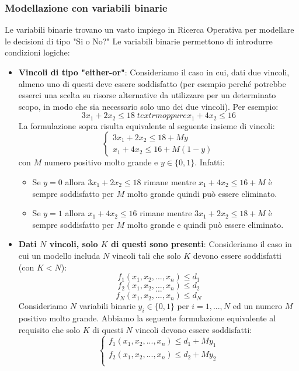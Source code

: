 \documentclass[12pt]{article}
\begin{document}
\subsubsection{Modellazione con variabili binarie}
Le variabili binarie trovano un vasto impiego in Ricerca Operativa per modellare le decisioni di tipo "Si o No?"
Le variabili binarie permettono di introdurre condizioni logiche: \newline
\begin{itemize}
    \item \textbf{Vincoli di tipo "either-or"}: Consideriamo il caso in cui, dati due vincoli, almeno uno di questi deve essere soddisfatto (per esempio perché
    potrebbe esserci una scelta su risorse alternative da utilizzare per un determinato scopo, in modo che sia necessario solo uno dei due vincoli). Per esempio:
    $$3x_1 + 2x_2 \leq 18 \; textrm{oppure } x_1 + 4x_2 \leq 16$$
    La formulazione sopra risulta equivalente al seguente insieme di vincoli:
    $$\begin{cases}
        3x_1 + 2x_2 \leq 18 + My \\
        x_1 + 4x_2 \leq 16 + M(1-y)
    \end{cases}$$
    con $M$ numero positivo molto grande e $y \in \{0,1\}$.
    Infatti:
    \begin{itemize}
        \item Se $y = 0$ allora $3x_1 + 2x_2 \leq 18$ rimane mentre $x_1 + 4x_2 \leq 16 + M$ è sempre soddisfatto per $M$ molto grande quindi può essere eliminato.
        \item Se $y = 1$ allora $x_1 + 4x_2 \leq 16$ rimane mentre $3x_1 + 2x_2 \leq 18 + M$ è sempre soddisfatto per $M$ molto grande e quindi può essere eliminato.
    \end{itemize}
    \item \textbf{Dati $N$ vincoli, solo $K$ di questi sono presenti}: Consideriamo il caso in cui un modello includa $N$ vincoli tali che solo $K$ devono essere soddisfatti (con $K < N$):
    $$f_1(x_1, x_2, ..., x_n) \leq d_1$$
    $$f_2(x_1, x_2, ..., x_n) \leq d_2$$
    $$...$$
    $$f_N(x_1, x_2, ..., x_n) \leq d_N$$
    Consideriamo $N$ variabili binarie $y_i \in \{0,1\}$ per $i = 1,...,N$ ed un numero $M$ positivo molto grande.
    Abbiamo la seguente formulazione equivalente al requisito che solo $K$ di questi $N$ vincoli devono essere soddisfatti:
    $$\begin{cases}
        f_1(x_1, x_2, ..., x_n) \leq d_1 + My_1 \\
        f_2(x_1, x_2, ..., x_n) \leq d_2 + My_2 \\

\end{cases}$$
\end{itemize}
\end{document}
